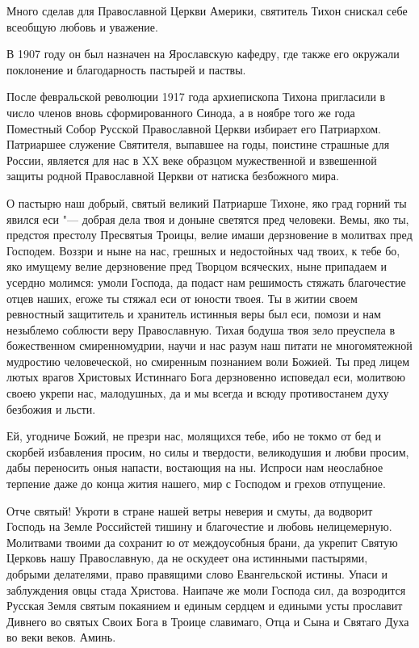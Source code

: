 Много сделав для Православной Церкви Америки, святитель Тихон снискал себе всеобщую любовь и уважение. 

В 1907 году он был назначен на Ярославскую кафедру, где также его окружали поклонение и благодарность пастырей и паствы. 

После февральской революции 1917 года архиепископа Тихона пригласили в число членов вновь сформированного Синода, а в ноябре того же года Поместный Собор Русской Православной Церкви избирает его Патриархом. Патриаршее служение Святителя, выпавшее на годы, поистине страшные для России, является для нас в XX веке образцом мужественной и взвешенной защиты родной Православной Церкви от натиска безбожного мира.




О пастырю наш добрый, святый великий Патриарше Тихоне, яко град горний ты явился еси "--- добрая дела твоя и доныне светятся пред человеки. Вемы, яко ты, предстоя престолу Пресвятыя Троицы, велие имаши дерзновение в молитвах пред Господем. Воззри и ныне на нас, грешных и недостойных чад твоих, к тебе бо, яко имущему велие дерзновение пред Творцом всяческих, ныне припадаем и усердно молимся: умоли Господа, да подаст нам решимость стяжать благочестие отцев наших, егоже ты стяжал еси от юности твоея. Ты в житии своем ревностный защититель и хранитель истинныя веры был еси, помози и нам незыблемо соблюсти веру Православную. Тихая бодуша твоя зело преуспела в божественном смиренномудрии, научи и нас разум наш питати не многомятежной мудростию человеческой, но смиренным познанием воли Божией. Ты пред лицем лютых врагов Христовых Истиннаго Бога дерзновенно исповедал еси, молитвою своею укрепи нас, малодушных, да и мы всегда и всюду противостанем духу безбожия и льсти. 

Ей, угодниче Божий, не презри нас, молящихся тебе, ибо не токмо от бед и скорбей избавления просим, но силы и твердости, великодушия и любви просим, дабы переносить оныя напасти, востающия на ны. Испроси нам неослабное терпение даже до конца жития нашего, мир с Господом и грехов отпущение. 

Отче святый! Укроти в стране нашей ветры неверия и смуты, да водворит Господь на Земле Российстей тишину и благочестие и любовь нелицемерную. Молитвами твоими да сохранит ю от междоусобныя брани, да укрепит Святую Церковь нашу Православную, да не оскудеет она истинными пастырями, добрыми делателями, право правящими слово Евангельской истины. Упаси и заблуждения овцы стада Христова. Наипаче же моли Господа сил, да возродится Русская Земля святым покаянием и единым сердцем и едиными усты прославит Дивнего во святых Своих Бога в Троице славимаго, Отца и Сына и Святаго Духа во веки веков. Аминь.
\mychapterending

